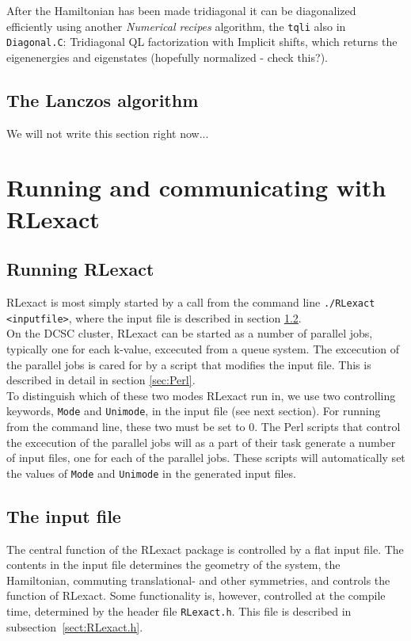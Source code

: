 \documentclass{article}
\begin{document}
After the Hamiltonian has been made tridiagonal it can be diagonalized efficiently using another \textit{Numerical recipes} algorithm, the \texttt{tqli} also in \texttt{Diagonal.C}: Tridiagonal QL factorization with Implicit shifts, which returns the eigenenergies and eigenstates (hopefully normalized - check this?).\\

\subsection{The Lanczos algorithm}
We will not write this section right now...

\section{Running and communicating with RLexact}

\subsection{Running RLexact} \label{sect:running}
RLexact is most simply started by a call from the command line \verb+./RLexact <inputfile>+, where the input file is described in section \ref{sect:input}.\\

On the DCSC cluster, RLexact can be started as a number of parallel jobs, typically one for each k-value, excecuted from a queue system. The excecution of the parallel jobs is cared for by a script that modifies the input file. This is described in detail in section \ref{sec:Perl}.\\

To distinguish which of these two modes RLexact run in, we use two controlling keywords, \verb+Mode+ and \verb+Unimode+, in the input file (see next section). For running from the command line, these two must be set to 0. The Perl scripts that control the excecution of the parallel jobs will as a part of their task generate a number of input files, one for each of the parallel jobs. These scripts will automatically set the values of \verb+Mode+ and \verb+Unimode+ in the generated input files.

\subsection{The input file} \label{sect:input}
The central function of the RLexact package is controlled by a flat input file. The contents in the input file determines the geometry of the system, the Hamiltonian, commuting translational- and other symmetries, and controls the function of RLexact. Some functionality is, however, controlled at the compile time, determined by the header file \verb+RLexact.h+. This file is described in subsection~\ref{sect:RLexact.h}.\\
\end{document}
